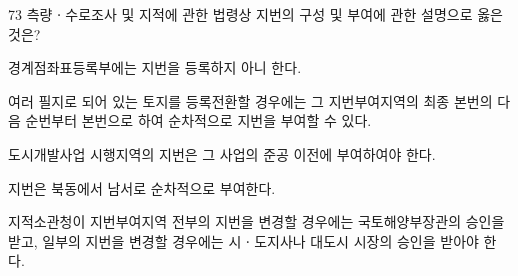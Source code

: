 \begin{question}{73}
측량ㆍ수로조사 및 지적에 관한 법령상 지번의 구성 및 부여에 관한 설명으로 옳은 것은?
\begin{choices}
  \item 경계점좌표등록부에는 지번을 등록하지 아니 한다.
  \item 여러 필지로 되어 있는 토지를 등록전환할 경우에는 그 지번부여지역의 최종 본번의 다음 순번부터 본번으로 하여 순차적으로 지번을 부여할 수 있다.
  \item 도시개발사업 시행지역의 지번은 그 사업의 준공 이전에 부여하여야 한다.
  \item 지번은 북동에서 남서로 순차적으로 부여한다.
  \item 지적소관청이 지번부여지역 전부의 지번을 변경할 경우에는 국토해양부장관의 승인을 받고, 일부의 지번을 변경할 경우에는 시ㆍ도지사나 대도시 시장의 승인을 받아야 한다.
\end{choices}
\end{question}

